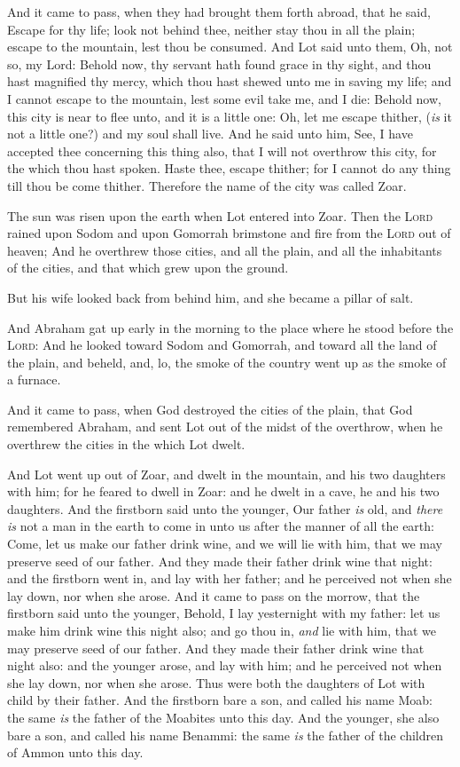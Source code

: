\documentclass[11pt,letterpaper,oneside]{memoir}
\begin{document}
And it came to pass, when they had brought them forth abroad, that he
said, Escape for thy life; look not behind thee, neither stay thou in
all the plain; escape to the mountain, lest thou be consumed. And Lot
said unto them, Oh, not so, my Lord: Behold now, thy servant hath found
grace in thy sight, and thou hast magnified thy mercy, which thou hast
shewed unto me in saving my life; and I cannot escape to the mountain,
lest some evil take me, and I die: Behold now, this city is near to flee
unto, and it is a little one: Oh, let me escape thither, (\emph{is} it
not a little one?) and my soul shall live. And he said unto him, See, I
have accepted thee concerning this thing also, that I will not overthrow
this city, for the which thou hast spoken. Haste thee, escape thither;
for I cannot do any thing till thou be come thither. Therefore the name
of the city was called Zoar.

The sun was risen upon the earth when Lot entered into Zoar. Then the
\textsc{Lord} rained upon Sodom and upon Gomorrah brimstone and fire from
the \textsc{Lord} out of heaven; And he overthrew those cities, and all
the plain, and all the inhabitants of the cities, and that which grew
upon the ground.

But his wife looked back from behind him, and she became a pillar of
salt.

And Abraham gat up early in the morning to the place where he stood
before the \textsc{Lord}: And he looked toward Sodom and Gomorrah, and
toward all the land of the plain, and beheld, and, lo, the smoke of the
country went up as the smoke of a furnace.

And it came to pass, when God destroyed the cities of the plain, that
God remembered Abraham, and sent Lot out of the midst of the overthrow,
when he overthrew the cities in the which Lot dwelt.

And Lot went up out of Zoar, and dwelt in the mountain, and his two
daughters with him; for he feared to dwell in Zoar: and he dwelt in a
cave, he and his two daughters. And the firstborn said unto the younger,
Our father \emph{is} old, and \emph{there is} not a man in the earth to
come in unto us after the manner of all the earth: Come, let us make our
father drink wine, and we will lie with him, that we may preserve seed
of our father. And they made their father drink wine that night: and the
firstborn went in, and lay with her father; and he perceived not when
she lay down, nor when she arose. And it came to pass on the morrow,
that the firstborn said unto the younger, Behold, I lay yesternight with
my father: let us make him drink wine this night also; and go thou in,
\emph{and} lie with him, that we may preserve seed of our father. And
they made their father drink wine that night also: and the younger
arose, and lay with him; and he perceived not when she lay down, nor
when she arose. Thus were both the daughters of Lot with child by their
father. And the firstborn bare a son, and called his name Moab: the same
\emph{is} the father of the Moabites unto this day. And the younger, she
also bare a son, and called his name Benammi: the same \emph{is} the
father of the children of Ammon unto this day.
\end{document}
